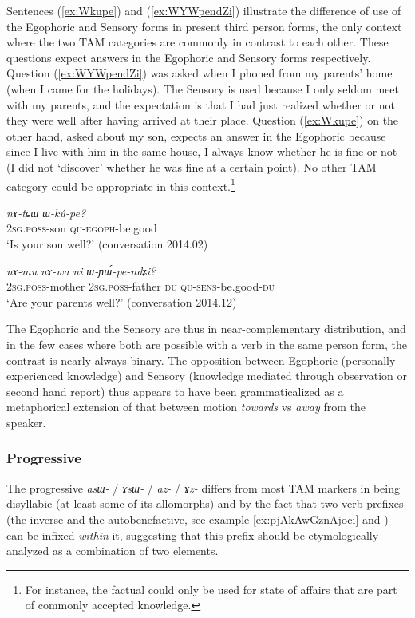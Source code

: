 \documentclass[oneside,a4paper,11pt]{article}
\newcommand{\ipa}[1]{\mbox{\phon\textit{#1}}} %
\begin{document}
Sentences (\ref{ex:Wkupe}) and (\ref{ex:WYWpendZi}) illustrate the difference of use of the Egophoric and Sensory forms in present third person forms, the only context where the two TAM categories are commonly in contrast to each other. These questions expect answers in the Egophoric and Sensory forms respectively. Question (\ref{ex:WYWpendZi}) was asked when I phoned from my parents' home (when I came for the holidays). The Sensory is used because I only seldom meet with my parents, and the expectation is that I had just realized whether or not they were well after having arrived at their place. Question (\ref{ex:Wkupe}) on the other hand, asked about my son, expects an answer in the Egophoric because since I live with him in the same house, I always know whether he is fine or not (I did not `discover' whether he was fine at a certain point). No other TAM category could be appropriate in this context.\footnote{For instance, the factual could only be used for state of affairs that are part of commonly accepted knowledge.}
 
\begin{exe}
\ex \label{ex:Wkupe}
\gll \ipa{nɤ-tɕɯ} \ipa{ɯ-kú-pe?}\\
\textsc{2sg.poss}-son \textsc{qu-egoph}-be.good\\
\glt `Is your son well?' (conversation 2014.02)
\end{exe}

\begin{exe}
\ex \label{ex:WYWpendZi}
\gll 
\ipa{nɤ-mu}  	\ipa{nɤ-wa}  	\ipa{ni}  	\ipa{ɯ-ɲɯ́-pe-ndʑi?}  \\
\textsc{2sg.poss}-mother \textsc{2sg.poss}-father \textsc{du} \textsc{qu-sens}-be.good-\textsc{du} \\
\glt `Are your parents well?' (conversation 2014.12)
\end{exe}

The Egophoric and the Sensory are thus in near-complementary distribution, and in the few cases where both are possible with a verb in the same person form, the contrast is nearly always binary. The opposition between Egophoric (personally experienced knowledge) and  Sensory (knowledge mediated through observation or second hand report)  thus appears to have been grammaticalized as a metaphorical extension of that between motion \textit{towards} vs \textit{away} from the speaker.
 
\subsubsection{Progressive} \label{sec:prog}
The progressive \ipa{asɯ-} / \ipa{ɤsɯ-} / \ipa{az-} / \ipa{ɤz-} differs from most TAM markers in being disyllabic (at least some of its allomorphs) and by the fact that two verb prefixes (the inverse and the autobenefactive, see example \ref{ex:pjAkAwGznAjoci} and \citealt{jacques15spontaneous}) can be infixed \textit{within} it, suggesting that this prefix should be etymologically analyzed as a combination of two elements.
\end{document}
